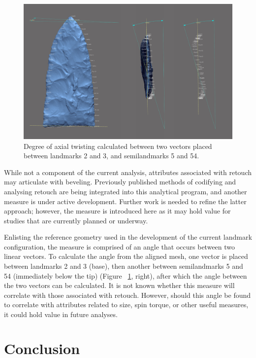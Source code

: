 \documentclass[review]{elsarticle}
\begin{document}
\begin{figure}[ht]\centering
\includegraphics[width=\linewidth]{gahagan-beveling.pdf}
\caption{Degree of axial twisting calculated between two vectors placed between landmarks 2 and 3, and semilandmarks 5 and 54.}
\label{fig:beveling}
\end{figure}

While not a component of the current analysis, attributes associated with retouch may articulate with beveling. Previously published methods of codifying and analysing retouch \citep{RN4308,RN3854} are being integrated into this analytical program, and another measure is under active development. Further work is needed to refine the latter approach; however, the measure is introduced here as it may hold value for studies that are currently planned or underway.

Enlisting the reference geometry used in the development of the current landmark configuration, the measure is comprised of an angle that occurs between two linear vectors. To calculate the angle from the aligned mesh, one vector is placed between landmarks 2 and 3 (base), then another between semilandmarks 5 and 54 (immediately below the tip) (Figure ~\ref{fig:beveling}, right), after which the angle between the two vectors can be calculated. It is not known whether this measure will correlate with those associated with retouch. However, should this angle be found to correlate with attributes related to size, spin torque, or other useful measures, it could hold value in future analyses.

\section*{Conclusion}
\end{document}

